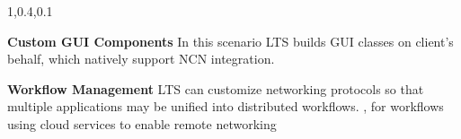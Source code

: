 \begin{frame}{}
{\begin{minipage}{1.08\textwidth}
\begin{lightquadblockc}{1,0.4,0.1}
\begin{minipage}{1.07\textwidth}
{\begin{enumerate}
\dmitem \textbf{Custom GUI Components}  \hspace{.5em} 
In this scenario LTS builds GUI classes 
on client's behalf, which natively support NCN 
integration. 
{\color[rgb]{0.3,0,0.1}{(dev: \$50K; licensing: \$5K/month)}}\vspace{12pt}

\dmitem \textbf{Workflow Management}  \hspace{.5em} 
LTS can customize networking 
protocols so that multiple applications may be 
unified into distributed workflows.
{\color[rgb]{0.3,0,0.1}{(dev: \$50K; licensing: \$15K/month}}, 
for workflows using cloud services 
to enable remote networking{\color[rgb]{0.3,0,0.1}{)}}

\end{enumerate}
}\end{minipage}
\end{lightquadblockc}
\end{minipage}

}

\end{frame}
